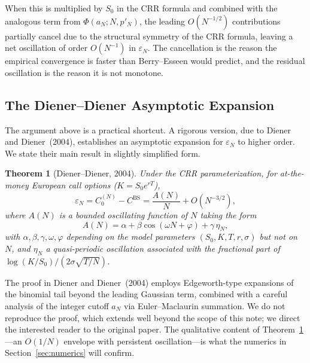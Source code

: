 \documentclass[11pt,a4paper]{article}
\theoremstyle{plain}
\newtheorem{theorem}{Theorem}[section]
\theoremstyle{definition}
\begin{document}
When this is multiplied by $S_0$ in the CRR formula and combined with the
analogous term from $\Phi(a_N; N, p'_N)$, the leading $O(N^{-1/2})$
contributions partially cancel due to the structural symmetry of the
CRR formula, leaving a net oscillation of order $O(N^{-1})$ in
$\varepsilon_N$. The cancellation is the reason the empirical
convergence is faster than Berry--Esseen would predict, and the
residual oscillation is the reason it is not monotone.

\subsection{The Diener--Diener Asymptotic Expansion}
\label{subsec:diener}

The argument above is a practical shortcut. A rigorous version, due to Diener and
Diener~(2004), establishes an asymptotic expansion for $\varepsilon_N$
to higher order. We state their main result in slightly simplified form.

\begin{theorem}[Diener--Diener, 2004]
\label{thm:diener}
Under the CRR parameterization, for at-the-money European call options
($K = S_0 e^{rT}$),
\begin{equation}
    \label{eq:diener-expansion}
    \varepsilon_N = C_0^{(N)} - C^{\mathrm{BS}}
    = \frac{A(N)}{N} + O(N^{-3/2}),
\end{equation}
where $A(N)$ is a bounded oscillating function of $N$ taking the form
\begin{equation}
    \label{eq:diener-A}
    A(N) = \alpha + \beta \cos(\omega N + \varphi) + \gamma\,\eta_N,
\end{equation}
with $\alpha, \beta, \gamma, \omega, \varphi$ depending on the model
parameters $(S_0, K, T, r, \sigma)$ but not on $N$, and $\eta_N$ a
quasi-periodic oscillation associated with the fractional part
of $\log(K/S_0)/(2\sigma\sqrt{T/N})$.
\end{theorem}

The proof in Diener and Diener~(2004) employs Edgeworth-type expansions
of the binomial tail beyond the leading Gaussian term, combined with
a careful analysis of the integer cutoff $a_N$ via Euler--Maclaurin
summation. We do not reproduce the proof, which extends well beyond the
scope of this note; we direct the interested reader to the original
paper. The qualitative content of Theorem~\ref{thm:diener}---an $O(1/N)$
envelope with persistent oscillation---is what the numerics in
Section~\ref{sec:numerics} will confirm.
\end{document}
